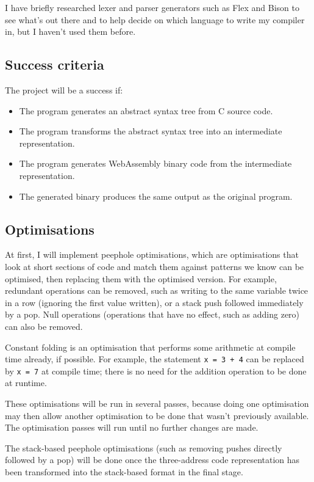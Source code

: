 I have briefly researched lexer and parser generators such as Flex and Bison to see what's out there and to help decide on which language to write my compiler in, but I haven't used them before.

\subsection*{Success criteria}

The project will be a success if:

\begin{itemize}
\item The program generates an abstract syntax tree from C source code.
\item The program transforms the abstract syntax tree into an intermediate representation.
\item The program generates WebAssembly binary code from the intermediate representation.
\item The generated binary produces the same output as the original program.
\end{itemize}


\subsection*{Optimisations}

At first, I will implement peephole optimisations, which are optimisations that look at short sections of code and match them against patterns we know can be optimised, then replacing them with the optimised version.
For example, redundant operations can be removed, such as writing to the same variable twice in a row (ignoring the first value written), or a stack push followed immediately by a pop.
Null operations (operations that have no effect, such as adding zero) can also be removed.

Constant folding is an optimisation that performs some arithmetic at compile time already, if possible. For example, the statement \texttt{x = 3 + 4} can be replaced by \texttt{x = 7} at compile time; there is no need for the addition operation to be done at runtime.

These optimisations will be run in several passes, because doing one optimisation may then allow another optimisation to be done that wasn't previously available. The optimisation passes will run until no further changes are made.

The stack-based peephole optimisations (such as removing pushes directly followed by a pop) will be done once the three-address code representation has been transformed into the stack-based format in the final stage.

